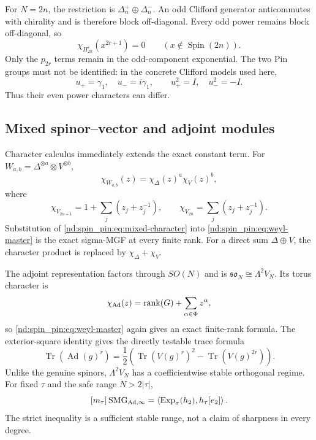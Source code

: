 \documentclass[10pt]{article}
\newcommand{\Tr}{\operatorname{Tr}}
\newcommand{\ExpS}{\operatorname{Exp}_{\sigma}}
\newcommand{\SMG}{\operatorname{SMG}}
\newcommand{\MGF}{\SMG}
\begin{document}
For $N=2n$, the restriction is $\Delta_n^+\oplus\Delta_n^-$.  An odd
Clifford generator anticommutes with chirality and is therefore block
off-diagonal.  Every odd power remains block off-diagonal, so
\begin{equation}\label{nd:spin_pin:eq:pin-odd-trace}
 \chi_{\Pi_{2n}^\varepsilon}(x^{2r+1})=0
 \qquad(x\notin\operatorname{Spin}(2n)).
\end{equation}
Only the $p_{2r}$ terms remain in the odd-component exponential.  The two Pin
groups must not be identified: in the concrete Clifford models used here,
\begin{equation}\label{nd:spin_pin:eq:pin-square}
 u_+=\gamma_1,\quad u_- = i\gamma_1,
 \qquad u_+^2=I,\quad u_-^2=-I.
\end{equation}
Thus their even power characters can differ.

\subsection{Mixed spinor--vector and adjoint modules}

Character calculus immediately extends the exact constant term.  For
$W_{a,b}=\Delta^{\otimes a}\otimes V^{\otimes b}$,
\begin{equation}\label{nd:spin_pin:eq:mixed-character}
 \chi_{W_{a,b}}(z)=\chi_\Delta(z)^a\chi_V(z)^b,
\end{equation}
where
\[
 \chi_{V_{2n+1}}=1+\sum_j(z_j+z_j^{-1}),\qquad
 \chi_{V_{2n}}=\sum_j(z_j+z_j^{-1}).
\]
Substitution of \eqref{nd:spin_pin:eq:mixed-character} into \eqref{nd:spin_pin:eq:weyl-master} is the
exact sigma-MGF at every finite rank.  For a direct sum $\Delta\oplus V$, the
character product is replaced by $\chi_\Delta+\chi_V$.

The adjoint representation factors through $SO(N)$ and is
$\mathfrak{so}_N\cong\Lambda^2V_N$.  Its torus character is
\begin{equation}\label{nd:spin_pin:eq:adjoint-character}
 \chi_{\rm Ad}(z)=\operatorname{rank}(G)+\sum_{\alpha\in\Phi}z^\alpha,
\end{equation}
so \eqref{nd:spin_pin:eq:weyl-master} again gives an exact finite-rank formula.  The
exterior-square identity gives the directly testable trace formula
\begin{equation}\label{nd:spin_pin:eq:adjoint-trace}
 \boxed{\Tr(\operatorname{Ad}(g)^r)=\frac12\left(
 \Tr(V(g)^r)^2-\Tr(V(g)^{2r})\right).}
\end{equation}
Unlike the genuine spinors, $\Lambda^2V_N$ has a coefficientwise stable
orthogonal regime.  For fixed $\tau$ and the safe range $N>2|\tau|$,
\begin{equation}\label{nd:spin_pin:eq:adjoint-stable}
 [m_\tau]\MGF_{{\rm Ad},\infty}
 =\left\langle\ExpS(h_2),h_\tau[e_2]\right\rangle.
\end{equation}
The strict inequality is a sufficient stable range, not a claim of
sharpness in every degree.
\end{document}
